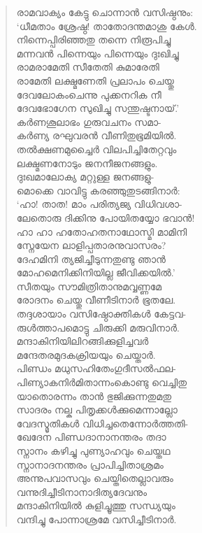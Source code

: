 \begin{verse}
രാമവാക്യം കേട്ടു ചൊന്നാന്‍ വസിഷ്ഠനും:\\
‘ധീമതാം ശ്രേഷ്ഠ! താതോദന്തമാശു കേള്‍.\\
നിന്നെപ്പിരിഞ്ഞതു തന്നെ നിരൂപിച്ചു\\
മന്നവന്‍ പിന്നെയും പിന്നെയും ദുഃഖിച്ചു\\
രാമരാമേതി സീതേതി കുമാരേതി\\
രാമേതി ലക്ഷ്മണേതി പ്രലാപം ചെയ്തു\\
ദേവലോകംചെന്നു പുക്കനറിക നീ\\
ദേവഭോഗേന സുഖിച്ചു സന്തുഷ്ടനായ്.’\\
കര്‍ണശൂലാഭം ഗുരുവചനം സമാ-\\
കര്‍ണ്യ രഘുവരന്‍ വീണിതുഭൂമിയില്‍.\\
തല്‍ക്ഷണമുച്ചൈര്‍ വിലപിച്ചിതേറ്റവും\\
ലക്ഷ്മണനോടും ജനനീജനങ്ങളും.\\
ദുഃഖമാലോക്യ മറ്റുള്ള ജനങ്ങളു-\\
മൊക്കെ വാവിട്ടു കരഞ്ഞുതുടങ്ങിനാര്‍:\\
‘ഹാ! താത! മാം പരിത്യജ്യ വിധിവശാ-\\
ലേതൊരു ദിക്കിനു പോയിതയ്യോ ഭവാന്‍!\\
ഹാ ഹാ ഹതോഹതനാഥോസ്മി മാമിനി\\
സ്നേയേന ലാളിപ്പതാരനുവാസരം?\\
ദേഹമിനി ത്യജിച്ചീടുന്നതുണ്ടു ഞാന്‍\\
മോഹമെനിക്കിനിയില്ല ജീവിക്കയില്‍.’\\
സീതയും സൗമിത്രിതാനുമവ്വണ്ണമേ\\
രോദനം ചെയ്തു വീണീടിനാര്‍ ഭൂതലേ.\\
തദ്ദശായാം വസിഷ്ഠോക്തികള്‍ കേട്ടവ-\\
രുള്‍ത്താപമൊട്ടു ചിരുക്കി മരുവിനാര്‍.\\
മന്ദാകിനിയിലിറങ്ങിക്കുളിച്ചവര്‍\\
മന്ദേതരമുദകക്രിയയും ചെയ്താര്‍.\\
പിണ്ഡം മധുസഹിതേംഗുദീസല്‍ഫല-\\
പിണ്യാകനിര്‍മിതാന്നംകൊണ്ടു വെച്ചിതു\\
യാതൊരന്നം താന്‍ ഭുജിക്കുന്നതുമതു\\
സാദരം നല്ക പിതൃക്കള്‍ക്കുമെന്നാല്ലോ\\
വേദസ്മൃതികള്‍ വിധിച്ചതെന്നോര്‍ത്തതി-\\
ഖേദേന പിണ്ഡദാനാനന്തരം തദാ\\
സ്നാനം കഴിച്ചു പുണ്യാഹവും ചെയ്തഥ\\
സ്നാനാദനന്തരം പ്രാപിച്ചിതാശ്രമം\\
അന്നുപവാസവും ചെയ്തിതെല്ലാവരും\\
വന്നുദിച്ചീടിനാനാദിത്യദേവനും\\
മന്ദാകിനിയില്‍ കുളിച്ചൂത്തു സന്ധ്യയും\\
വന്ദിച്ചു പോന്നാശ്രമേ വസിച്ചീടിനാര്‍.
\end{verse}

